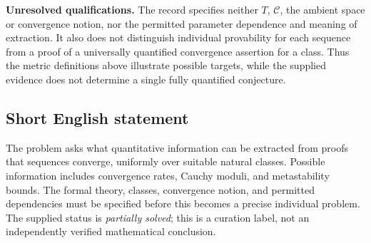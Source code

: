 \documentclass[11pt]{article}
\begin{document}
\textbf{Unresolved qualifications.} The record specifies neither \(T\), \(\mathcal C\), the ambient space or convergence notion, nor the permitted parameter dependence and meaning of extraction. It also does not distinguish individual provability for each sequence from a proof of a universally quantified convergence assertion for a class. Thus the metric definitions above illustrate possible targets, while the supplied evidence does not determine a single fully quantified conjecture.
\subsection{Short English statement}
The problem asks what quantitative information can be extracted from proofs that sequences converge, uniformly over suitable natural classes. Possible information includes convergence rates, Cauchy moduli, and metastability bounds. The formal theory, classes, convergence notion, and permitted dependencies must be specified before this becomes a precise individual problem. The supplied status is \emph{partially solved}; this is a curation label, not an independently verified mathematical conclusion.
\end{document}
